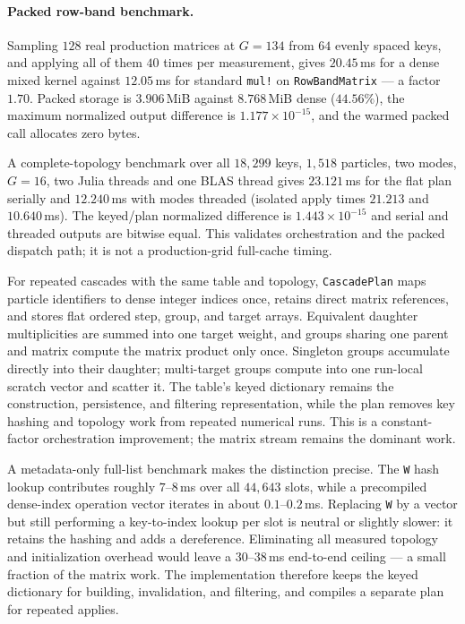 \documentclass[11pt]{article}
\begin{document}
\paragraph{Packed row-band benchmark.}
Sampling $128$ real production matrices at $G=134$ from $64$ evenly spaced
keys, and applying all of them $40$ times per measurement, gives $20.45$\,ms
for a dense mixed kernel against $12.05$\,ms for standard \texttt{mul!} on
\texttt{RowBandMatrix} --- a factor $1.70$.  Packed storage is $3.906$\,MiB
against $8.768$\,MiB dense ($44.56\%$), the maximum normalized output
difference is $1.177\times10^{-15}$, and the warmed packed call allocates
zero bytes.

A complete-topology benchmark over all $18{,}299$ keys, $1{,}518$ particles,
two modes, $G=16$, two Julia threads and one BLAS thread gives $23.121$\,ms
for the flat plan serially and $12.240$\,ms with modes threaded (isolated
apply times $21.213$ and $10.640$\,ms).  The keyed/plan normalized difference
is $1.443\times10^{-15}$ and serial and threaded outputs are bitwise equal.
This validates orchestration and the packed dispatch path; it is not a
production-grid full-cache timing.

For repeated cascades with the same table and topology, \texttt{CascadePlan}
maps particle identifiers to dense integer indices once, retains direct
matrix references, and stores flat ordered step, group, and target arrays.
Equivalent daughter multiplicities are summed into one target weight, and
groups sharing one parent and matrix compute the matrix product only once.
Singleton groups accumulate directly into their daughter; multi-target groups
compute into one run-local scratch vector and scatter it.  The table's keyed
dictionary remains the construction, persistence, and filtering
representation, while the plan removes key hashing and topology work from
repeated numerical runs.  This is a constant-factor orchestration improvement;
the matrix stream remains the dominant work.

A metadata-only full-list benchmark makes the distinction precise.  The
\texttt{W} hash lookup contributes roughly $7$--$8$\,ms over all
$44{,}643$ slots, while a precompiled dense-index operation vector iterates
in about $0.1$--$0.2$\,ms.  Replacing \texttt{W} by a vector but still
performing a key-to-index lookup per slot is neutral or slightly slower: it
retains the hashing and adds a dereference.  Eliminating all measured
topology and initialization overhead would leave a $30$--$38$\,ms
end-to-end ceiling --- a small fraction of the matrix work.  The
implementation therefore keeps the keyed dictionary for building,
invalidation, and filtering, and compiles a separate plan for repeated
applies.
\end{document}
